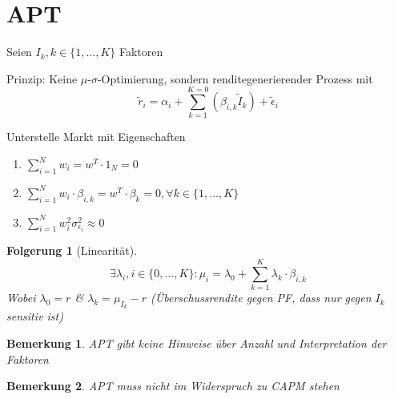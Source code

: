 \documentclass[a4paper]{article}
\theoremstyle{break}
\newcommand{\ms}{$\mu$-$\sigma$}
\newtheorem{ann}{Bemerkung}[section]
\newtheorem{der}{Folgerung}[section]
\begin{document}

\section{APT}

Seien $I_k, k \in \{1, \dots, K\}$ Faktoren

Prinzip: Keine \ms-Optimierung, sondern renditegenerierender Prozess mit
$$\tilde{r}_i = \alpha_i + \sum_{k=1}^{K=0} (\beta_{i,k}\tilde{I}_k)+ \tilde{\epsilon}_i$$

Unterstelle Markt mit Eigenschaften
\begin{enumerate}
   \item $\sum_{i=1}^{N} w_i = w^T \cdot 1_{N} = 0$
   \item $\sum_{i=1}^{N} w_i \cdot \beta_{i,k} = w^T \cdot \beta_k = 0, \forall k \in \{1, \dots, K\}$
   \item $\sum_{i=1}^{N} w^{2}_i \sigma^{2}_{\epsilon_i} \approx 0$
\end{enumerate}
\begin{der}[Linearität]
    $$\exists \lambda_i, i \in \{0, \dots, K\}:  \mu_i = \lambda_0 + \sum_{k=1}^{K}\lambda_k \cdot \beta_{i,k}$$
    Wobei $\lambda_0 = r$ \& $\lambda_k = \mu_{I_k} -r$ (Überschussrendite gegen PF, dass nur gegen $I_k$ sensitiv ist)
\end{der}


\begin{ann}
  APT gibt keine Hinweise über Anzahl und Interpretation der Faktoren
\end{ann}
\begin{ann}
    APT muss nicht im Widerspruch zu CAPM stehen
\end{ann}
\end{document}
